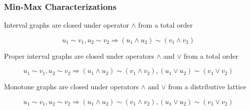 \documentclass[a4paper,handout]{beamer}
\theoremstyle{definition}
\begin{document}
\begin{frame}
\frametitle{Min-Max Characterizations}
\begin{block}{}
Interval graphs are closed under operator \(\wedge\) from a total order
\end{block}
\begin{exampleblock}{}
\vspace{-6pt}
\[u_1 \sim v_1, u_2 \sim v_2 \Rightarrow (u_1 \wedge u_2) \sim (v_1 \wedge v_2)\]
\end{exampleblock}
\pause
\vskip 12pt
\begin{block}{}
Proper interval graphs are closed under operators \(\wedge\) and \(\vee\) from a total order
\end{block}
\begin{exampleblock}{}
\vspace{-18pt}
\[u_1 \sim v_1, u_2 \sim v_2 \Rightarrow (u_1 \wedge u_2) \sim (v_1 \wedge v_2), (u_1 \vee u_2) \sim (v_1 \vee v_2)\]
\end{exampleblock}
\pause
\vskip 12pt
\begin{block}{}
Monotone graphs are closed under operators \(\wedge\) and \(\vee\) from a distributive lattice
\end{block}
\begin{exampleblock}{}
\vspace{-18pt}
\[u_1 \sim v_1, u_2 \sim v_2 \Rightarrow (u_1 \wedge u_2) \sim (v_1 \wedge v_2), (u_1 \vee u_2) \sim (v_1 \vee v_2)\]
\end{exampleblock}
\end{frame}
\end{document}
